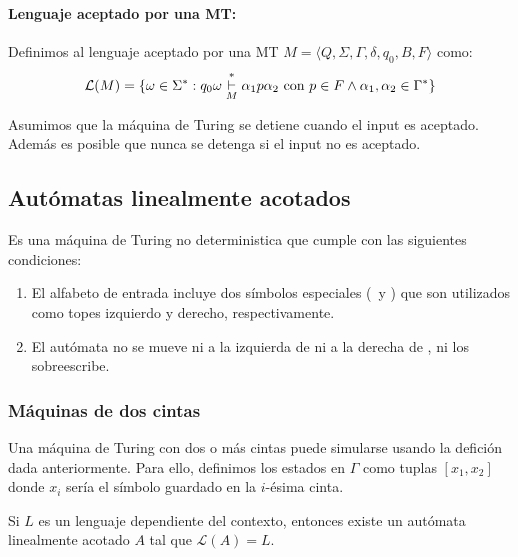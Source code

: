 \paragraph{Lenguaje aceptado por una MT:} Definimos al lenguaje aceptado por una MT \(M=\langle Q, \Sigma, \Gamma, \delta, q_0, B, F \rangle\) como:
\[
  \mathcal{L}(M) = \{ \omega \in \Sigma^*  : q_0\omega \overset{*}{\underset{M}{\vdash}} \alpha_1 p\alpha_2 \text{ con } p\in F \land \alpha_1,\alpha_2\in\Gamma^* \}
\]

Asumimos que la máquina de Turing se detiene cuando el input es aceptado. Además es posible que nunca se detenga si el input no es aceptado.

\subsection{Autómatas linealmente acotados}
Es una máquina de Turing  no deterministica que cumple con las siguientes condiciones:
\begin{enumerate}
  \item El alfabeto de entrada incluye dos símbolos especiales (\textcentoldstyle~y \textdollar) que son utilizados como topes izquierdo y derecho, respectivamente.
  \item El autómata no se mueve ni a la izquierda de \textcentoldstyle ni a la derecha de \textdollar, ni los sobreescribe.
\end{enumerate}

\subsubsection*{Máquinas de dos cintas}
Una máquina de Turing con dos o más cintas puede simularse usando la defición dada anteriormente. Para ello, definimos los estados en \(\Gamma\) como tuplas \([x_1, x_2]\) donde \(x_i\) sería el símbolo guardado en la \(i\)-ésima cinta.


\begin{teorema}
  Si \(L\) es un lenguaje dependiente del contexto, entonces existe un autómata linealmente acotado \(A\) tal que \(\mathcal{L}(A) = L\).
\end{teorema}

